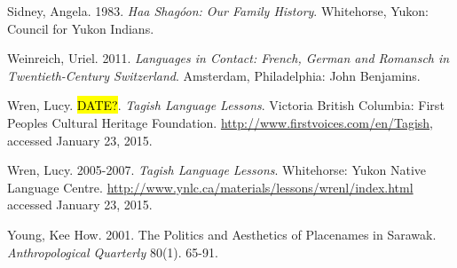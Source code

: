 \begin{hang}
Sidney, Angela. 1983. \textit{Haa Shagóon: Our Family History}. Whitehorse, Yukon: Council for Yukon Indians.

Weinreich, Uriel. 2011. \textit{Languages in Contact: French, German and Romansch in Twentieth-Century Switzerland}. Amsterdam, Philadelphia: John Benjamins.

Wren, Lucy. \hl{DATE?}. \textit{Tagish Language Lessons}. Victoria British Columbia: First Peoples Cultural Heritage Foundation. \url{http://www.firstvoices.com/en/Tagish}, accessed January 23, 2015.

Wren, Lucy. 2005-2007.	\textit{Tagish Language Lessons}. Whitehorse: Yukon Native Language Centre.
\url{http://www.ynlc.ca/materials/lessons/wrenl/index.html}
accessed January 23, 2015.

Young, Kee How. 2001. The Politics and Aesthetics of Placenames in Sarawak. \textit{Anthropological Quarterly} 80(1). 65-91.

\end{hang}


\label{moore-ch-end}
